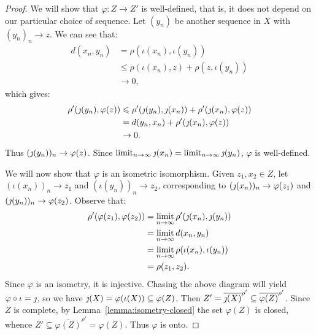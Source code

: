 \begin{theorem}
\begin{proof}
                We will show that $\varphi:Z \rightarrow Z'$ is well-defined, that is, it does not depend on our particular choice of sequence. Let $(y_n)$ be another sequence in $X$ with $(y_n)_n \rightarrow z$. We can see that:
                    \begin{equation*}
                    \begin{split}
                        d(x_n,y_n) 
                        & = \rho(\iota(x_n),\iota(y_n)) \\
                        & \leq \rho(\iota(x_n), z) + \rho(z, \iota(y_n)) \\
                        & \rightarrow 0,
                    \end{split}
                    \end{equation*}
                which gives:
                    \begin{equation*}
                    \begin{split}
                        \rho'(\jmath(y_n), \varphi(z))
                        & \leqslant \rho'(\jmath(y_n),\jmath(x_n)) + \rho'(\jmath(x_n),\varphi(z)) \\
                        & = d(y_n,x_n) + \rho'(\jmath(x_n),\varphi(z)) \\
                        & \rightarrow 0.
                    \end{split}
                    \end{equation*}
                Thus $(\jmath(y_n))_n \rightarrow \varphi(z)$. Since $\operatorname*{limit}_{n \rightarrow \infty}\jmath(x_n) = \operatorname*{limit}_{n \rightarrow \infty}\jmath(y_n)$, $\varphi$ is well-defined.

                We will now show that $\varphi$ is an isometric isomorphism. Given $z_1,x_2 \in Z$, let $(\iota(x_n))_n \rightarrow z_1$ and $(\iota(y_n))_n \rightarrow z_2$, corresponding to $(\jmath(x_n))_n \rightarrow \varphi(z_1)$ and $(\jmath(y_n))_n \rightarrow \varphi(z_2)$. Observe that:
                    \begin{equation*}
                    \begin{split}
                        \rho'(\varphi(z_1),\varphi(z_2))
                        & = \operatorname*{limit}_{n \rightarrow \infty} \rho'(\jmath(x_n),\jmath(y_n)) \\
                        & = \operatorname*{limit}_{n \rightarrow \infty}d(x_n,y_n) \\
                        & = \operatorname*{limit}_{n \rightarrow \infty}\rho(\iota(x_n),\iota(y_n)) \\
                        & = \rho(z_1,z_2).
                    \end{split}
                    \end{equation*}
                Since $\varphi$ is an isometry, it is injective. Chasing the above diagram will yield $\varphi \circ \iota  = \jmath$, so we have $\jmath(X) = \varphi(\iota(X)) \subseteq \varphi(Z)$. Then $Z' = \overline{\jmath(X)}^{\rho'} \subseteq \overline{\varphi(Z)}^{\rho'}$. Since $Z$ is complete, by Lemma~\ref{lemma:isometry-closed} the set $\varphi(Z)$ is closed, whence $Z' \subseteq \overline{\varphi(Z)}^{\rho'} = \varphi(Z)$. Thus $\varphi$ is onto.


\end{proof}
\end{theorem}
